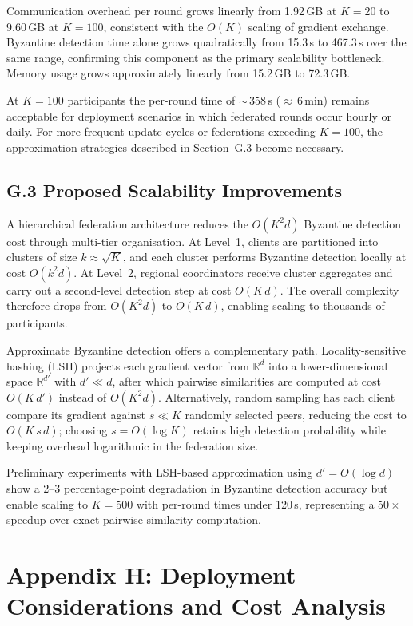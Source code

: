 \documentclass[12pt,a4paper]{article}
\theoremstyle{definition}
\begin{document}
Communication overhead per round grows linearly from 1.92\,GB at $K=20$ to 9.60\,GB at $K=100$, consistent with the $O(K)$ scaling of gradient exchange. Byzantine detection time alone grows quadratically from 15.3\,s to 467.3\,s over the same range, confirming this component as the primary scalability bottleneck. Memory usage grows approximately linearly from 15.2\,GB to 72.3\,GB.

At $K=100$ participants the per-round time of ${\sim}\,358$\,s (${\approx}\,6$\,min) remains acceptable for deployment scenarios in which federated rounds occur hourly or daily. For more frequent update cycles or federations exceeding $K=100$, the approximation strategies described in Section~G.3 become necessary.

\subsection{G.3 Proposed Scalability Improvements}

A hierarchical federation architecture reduces the $O(K^2 d)$ Byzantine detection cost through multi-tier organisation. At Level~1, clients are partitioned into clusters of size $k \approx \sqrt{K}$, and each cluster performs Byzantine detection locally at cost $O(k^2 d)$. At Level~2, regional coordinators receive cluster aggregates and carry out a second-level detection step at cost $O(K\,d)$. The overall complexity therefore drops from $O(K^2 d)$ to $O(K\,d)$, enabling scaling to thousands of participants.

Approximate Byzantine detection offers a complementary path. Locality-sensitive hashing (LSH) projects each gradient vector from $\mathbb{R}^d$ into a lower-dimensional space $\mathbb{R}^{d'}$ with $d' \ll d$, after which pairwise similarities are computed at cost $O(K\,d')$ instead of $O(K^2 d)$. Alternatively, random sampling has each client compare its gradient against $s \ll K$ randomly selected peers, reducing the cost to $O(K\,s\,d)$; choosing $s = O(\log K)$ retains high detection probability while keeping overhead logarithmic in the federation size.

Preliminary experiments with LSH-based approximation using $d' = O(\log d)$ show a 2--3 percentage-point degradation in Byzantine detection accuracy but enable scaling to $K = 500$ with per-round times under 120\,s, representing a $50{\times}$ speedup over exact pairwise similarity computation.

\section{Appendix H: Deployment Considerations and Cost Analysis}
\end{document}
